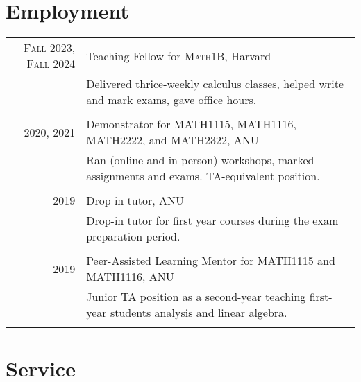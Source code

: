 \documentclass[a4paper,11pt]{article} %
\begin{document}

\section{Employment}

\begin{tabular}{r|p{12cm}}

\textsc{Fall 2023, Fall 2024} & Teaching Fellow for \textsc{Math1B}, Harvard \emph{}\\
& \footnotesize{Delivered thrice-weekly calculus classes, helped write and mark exams, gave office hours.}\\
\multicolumn{2}{c}{} \\


\textsc{2020, 2021} & Demonstrator for \textsc{MATH1115, MATH1116, MATH2222}, and \textsc{MATH2322}, ANU \emph{}\\
& \footnotesize{Ran (online and in-person) workshops, marked assignments and exams. TA-equivalent position.}\\
\multicolumn{2}{c}{} \\


\textsc{2019} & Drop-in tutor, ANU \emph{}\\
& \footnotesize{Drop-in tutor for first year courses during the exam preparation period.}\\
\multicolumn{2}{c}{} \\


\textsc{2019} & Peer-Assisted Learning Mentor for \textsc{MATH1115} and \textsc{MATH1116}, ANU \emph{}\\
& \footnotesize{Junior TA position as a second-year teaching first-year students analysis and linear algebra.}\\
\multicolumn{2}{c}{}

\end{tabular}

\section{Service}
\end{document}
